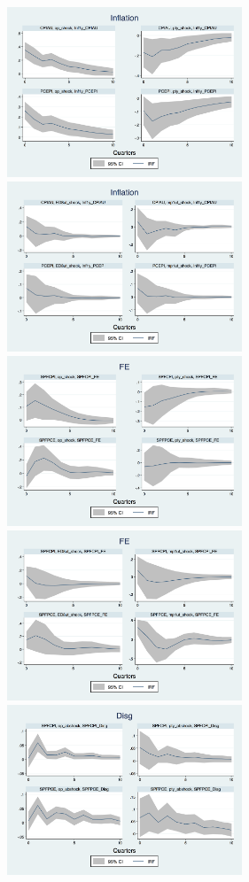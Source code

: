 \documentclass[]{article}
\begin{document}
\begin{figure}[ht]
	\centering
	\includegraphics[width=7cm]{figures/Inf_ashocks_nmp.png}  
	\includegraphics[width=7cm]{figures/Inf_ashocks.png} \\
	\smallskip
	\includegraphics[width=7cm]{figures/SPFFE_ashocks_nmp.png} 
	\includegraphics[width=7cm]{figures/SPFFE_ashocks.png} \\
	\smallskip
	\includegraphics[width=7cm]{figures/SPFDisg_ab_ashocks_nmp.png} 

\end{figure}
\end{document}
